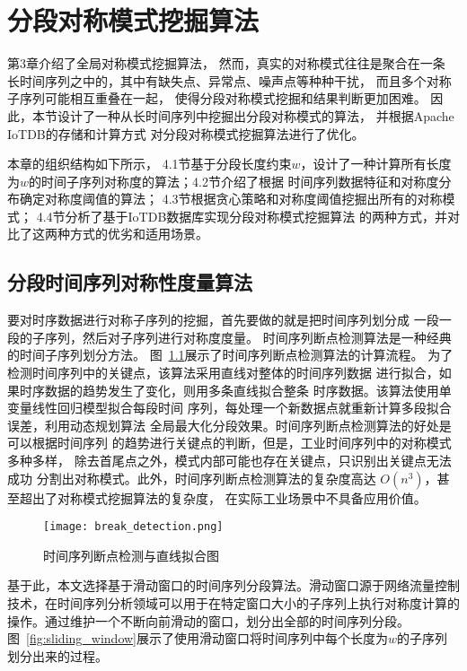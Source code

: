 
\chapter{分段对称模式挖掘算法}
第3章介绍了全局对称模式挖掘算法，
然而，真实的对称模式往往是聚合在一条
长时间序列之中的，其中有缺失点、异常点、噪声点等种种干扰，
而且多个对称子序列可能相互重叠在一起，
使得分段对称模式挖掘和结果判断更加困难。
因此，本节设计了一种从长时间序列中挖掘出分段对称模式的算法，
并根据Apache IoTDB的存储和计算方式
对分段对称模式挖掘算法进行了优化。

本章的组织结构如下所示，
4.1节基于分段长度约束$w$，设计了一种计算所有长度
为$w$的时间子序列对称度的算法；4.2节介绍了根据
时间序列数据特征和对称度分布确定对称度阈值的算法；
4.3节根据贪心策略和对称度阈值挖掘出所有的对称模式；
4.4节分析了基于IoTDB数据库实现分段对称模式挖掘算法
的两种方式，并对比了这两种方式的优劣和适用场景。

\section{分段时间序列对称性度量算法}
要对时序数据进行对称子序列的挖掘，首先要做的就是把时间序列划分成
一段一段的子序列，然后对子序列进行对称度度量。
时间序列断点检测算法是一种经典的时间子序列划分方法。
图~\ref{fig:break_detection}展示了时间序列断点检测算法的计算流程。
为了检测时间序列中的关键点，该算法采用直线对整体的时间序列数据
进行拟合，如果时序数据的趋势发生了变化，则用多条直线拟合整条
时序数据。该算法使用单变量线性回归模型拟合每段时间
序列，每处理一个新数据点就重新计算多段拟合误差，利用动态规划算法
全局最大化分段效果。时间序列断点检测算法的好处是可以根据时间序列
的趋势进行关键点的判断，但是，工业时间序列中的对称模式多种多样，
除去首尾点之外，模式内部可能也存在关键点，只识别出关键点无法成功
分割出对称模式。此外，时间序列断点检测算法的复杂度高达
$O\left(n^{3}\right)$，甚至超出了对称模式挖掘算法的复杂度，
在实际工业场景中不具备应用价值。
\begin{figure}[t]
  \centering
  \texttt{[image: break\_detection.png]}
  \caption{时间序列断点检测与直线拟合图}
  \label{fig:break_detection}
\end{figure}

基于此，本文选择基于滑动窗口的时间序列分段算法。滑动窗口源于网络流量控制
技术，在时间序列分析领域可以用于在特定窗口大小的子序列上执行对称度计算的
操作。通过维护一个不断向前滑动的窗口，划分出全部的时间序列分段。
图~\ref{fig:sliding_window}展示了使用滑动窗口将时间序列中每个长度为$w$的子序列划分出来的过程。

